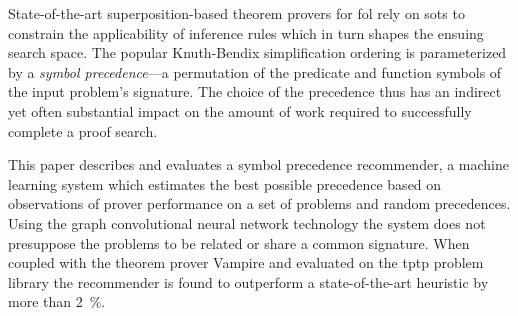


State-of-the-art superposition-based theorem provers for \acrlong{fol} %
rely on \glspl{sot} to constrain the applicability of inference rules 
which in turn shapes the ensuing search space.
The popular Knuth-Bendix simplification ordering is parameterized by 
a \emph{symbol precedence}---a permutation of the predicate and function symbols
of the input problem's signature.
The choice of the precedence thus has an indirect yet often substantial impact 
on the amount of work required to successfully complete a proof search.


This paper describes and evaluates a symbol precedence recommender,
a machine learning system which estimates the best possible precedence
based on observations of prover performance on a set of problems and random precedences.
Using the graph convolutional neural network technology %
the system does not presuppose the problems to be related or share a common signature. 
When coupled with the theorem prover Vampire and evaluated on the \acrshort{tptp} problem library
the recommender is found to outperform a state-of-the-art heuristic by more than \SI{2}{\percent}.


